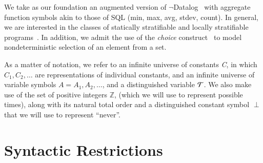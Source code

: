 
We take as our foundation 
an augmented version of \linebreak
$\lnot$Datalog~\cite{ullmanbook} with aggregate function
symbols akin to those of SQL (min, max, avg, stdev, count).  In general, we are interested in the classes of statically
stratifiable and locally stratifiable programs~\cite{prz}.  In addition, we admit the
use of the \emph{choice} construct~\cite{greedychoice, eventchoice} to model
nondeterministic selection of an element from a set.  

As a matter of notation, we refer to an infinite universe of constants \emph{C}, in which
$C_{1}, C_{2}, \ldots$ are representations of individual constants, and
an infinite universe of variable symbols $A = A_1, A_2, \ldots$, and a distinguished variable $\Tau$.
We also make use of the set of positive integers $\mathbb{Z}$,
(which we will use to represent possible times), along with its natural total order
 and a distinguished constant symbol $\perp$ that we will use to represent ``never''.

\section{Syntactic Restrictions}


